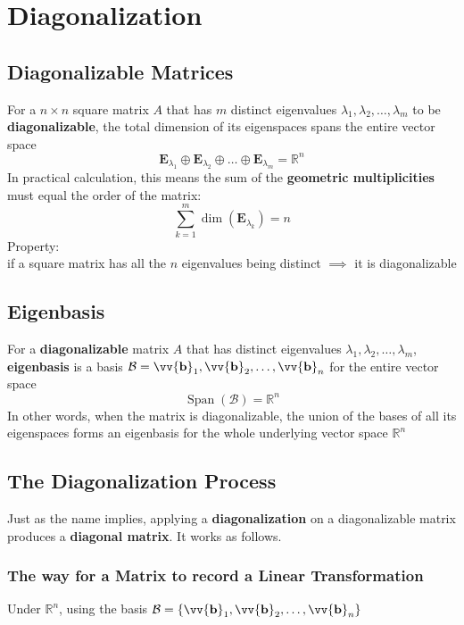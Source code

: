 \documentclass[11pt]{article}
\DeclareRobustCommand{\myvec}[1]{\vv{\mathbf{#1}}}
\newcommand{\mysubvecsp}[1]{\bm{{#1}}}
\newcommand{\myset}[1]{\mathcal{#1}}
\newcommand{\mymat}[1]{#1}
\begin{document}
    \section{Diagonalization}
    \subsection{Diagonalizable Matrices}
    For a $n \times n$ square matrix $\mymat{A}$ that has $m$ distinct eigenvalues $\lambda_1, \lambda_2, \dots, \lambda_m$ to be \textbf{diagonalizable}, the total dimension of its eigenspaces spans the entire vector space
    \begin{equation}
        \mysubvecsp{E}_{\lambda_1} \oplus \mysubvecsp{E}_{\lambda_2} \oplus \dots \oplus \mysubvecsp{E}_{\lambda_m} = \mathbb{R}^n
    \end{equation}
    In practical calculation, this means the sum of the \textbf{geometric multiplicities} must equal the order of the matrix:
    \begin{equation}
        \sum_{k=1}^{m} \dim(\mysubvecsp{E}_{\lambda_k}) = n
    \end{equation}
    Property: \\
    if a square matrix has all the $n$ eigenvalues being distinct $\implies$ it is diagonalizable

    \subsection{Eigenbasis}
    For a \textbf{diagonalizable} matrix $\mymat{A}$ that has distinct eigenvalues $\lambda_1, \lambda_2, \dots, \lambda_m$, \\
    \textbf{eigenbasis} is a basis $\myset{B} = \myvec{b}_1, \myvec{b}_2, \dots, \myvec{b}_n$ for the entire vector space
    \[ \operatorname{Span}(\myset{B}) = \mathbb{R}^n \]
    In other words, when the matrix is diagonalizable, the union of the bases of all its eigenspaces forms 
    an eigenbasis for the whole underlying vector space $\mathbb{R}^n$
    
    \subsection{The Diagonalization Process}
    Just as the name implies, applying a \textbf{diagonalization} on a diagonalizable matrix produces a \textbf{diagonal matrix}.
    It works as follows.
    
    \subsubsection{The way for a Matrix to record a Linear Transformation}
    Under $\mathbb{R}^n$, using the basis $\myset{B} = \{ \myvec{b}_1, \myvec{b}_2, \dots, \myvec{b}_n \}$ \vspace{1ex}
\end{document}
